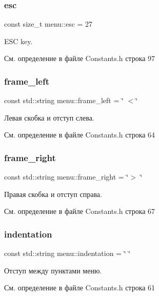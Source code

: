 \subsubsection{\texorpdfstring{esc}{esc}}
{\footnotesize\ttfamily const size\+\_\+t menu\+::esc = 27}

E\+SC key. 

См. определение в файле Constants.\+h строка 97

\mbox{\label{namespacemenu_ab9230afa22bdf260e3944290026a5a86}} 
\subsubsection{\texorpdfstring{frame\+\_\+left}{frame\_left}}
{\footnotesize\ttfamily const std\+::string menu\+::frame\+\_\+left = \char`\"{} $<$\char`\"{}}

Левая скобка и отступ слева. 

См. определение в файле Constants.\+h строка 64

\mbox{\label{namespacemenu_a3f786c7ab3caec7dfef9e1fa61b52ae7}} 
\subsubsection{\texorpdfstring{frame\+\_\+right}{frame\_right}}
{\footnotesize\ttfamily const std\+::string menu\+::frame\+\_\+right = \char`\"{}$>$ \char`\"{}}

Правая скобка и отступ справа. 

См. определение в файле Constants.\+h строка 67

\mbox{\label{namespacemenu_ac0906d6effd5dc68552a724a3edb9330}} 
\subsubsection{\texorpdfstring{indentation}{indentation}}
{\footnotesize\ttfamily const std\+::string menu\+::indentation = \char`\"{} \char`\"{}}

Отступ между пунктами меню. 

См. определение в файле Constants.\+h строка 61

